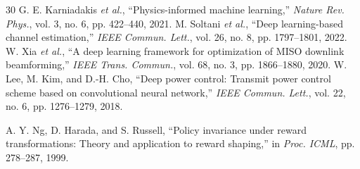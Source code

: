 \documentclass[journal]{IEEEtran}
\begin{document}
\begin{thebibliography}{30}
 G. E. Karniadakis \textit{et al.}, ``Physics-informed machine learning,'' \textit{Nature Rev. Phys.}, vol. 3, no. 6, pp. 422--440, 2021.
 M. Soltani \textit{et al.}, ``Deep learning-based channel estimation,'' \textit{IEEE Commun. Lett.}, vol. 26, no. 8, pp. 1797--1801, 2022.
 W. Xia \textit{et al.}, ``A deep learning framework for optimization of MISO downlink beamforming,'' \textit{IEEE Trans. Commun.}, vol. 68, no. 3, pp. 1866--1880, 2020.
 W. Lee, M. Kim, and D.-H. Cho, ``Deep power control: Transmit power control scheme based on convolutional neural network,'' \textit{IEEE Commun. Lett.}, vol. 22, no. 6, pp. 1276--1279, 2018.

 A. Y. Ng, D. Harada, and S. Russell, ``Policy invariance under reward transformations: Theory and application to reward shaping,'' in \textit{Proc. ICML}, pp. 278--287, 1999.
\end{thebibliography}
\end{document}
